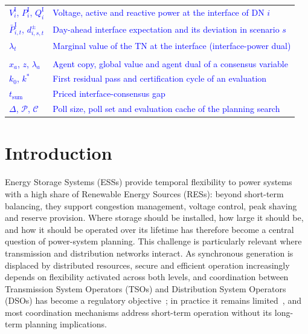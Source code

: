 \documentclass[preprint,12pt]{elsarticle}
\begin{document}
\begin{longtable}{@{}>{\raggedright\arraybackslash}p{} >{\raggedright\arraybackslash}p{}@{}}
        \textcolor{blue}{$V^{\text{I}}_{i}$, $P^{\text{I}}_{i}$, $Q^{\text{I}}_{i}$} & \textcolor{blue}{Voltage, active and reactive power at the interface of DN $i$} \\
        \textcolor{blue}{$\bar{P}^{\text{I}}_{i,t}$, $d^{\pm}_{i,s,t}$} & \textcolor{blue}{Day-ahead interface expectation and its deviation in scenario $s$} \\
        \textcolor{blue}{$\lambda_t$} & \textcolor{blue}{Marginal value of the TN at the interface (interface-power dual)} \\
        \midrule
        \multicolumn{2}{@{}l}{\textbf{Coordination and certification}}\\*
        \textcolor{blue}{$x_a$, $z$, $\lambda_a$} & \textcolor{blue}{Agent copy, global value and agent dual of a consensus variable} \\
        \textcolor{blue}{$k_0$, $k^{*}$} & \textcolor{blue}{First residual pass and certification cycle of an evaluation} \\
        \textcolor{blue}{$t_{\text{sum}}$} & \textcolor{blue}{Priced interface-consensus gap} \\
        \textcolor{blue}{$\Delta$, $\mathcal{P}$, $\mathcal{C}$} & \textcolor{blue}{Poll size, poll set and evaluation cache of the planning search} \\
    \end{longtable}
    \addtocounter{table}{-1}
\endgroup

\newpage
\section{Introduction}

Energy Storage Systems (ESSs) provide temporal flexibility to power systems with a high share of Renewable Energy Sources (RESs): beyond short-term balancing, they support congestion management, voltage control, peak shaving and reserve provision. 
Where storage should be installed, how large it should be, and how it should be operated over its lifetime has therefore become a central question of power-system planning. This challenge is particularly relevant where transmission and distribution networks interact. As synchronous generation is displaced by distributed resources, secure and efficient operation increasingly depends on flexibility activated across both levels, and coordination between Transmission System Operators (TSOs) and Distribution System Operators (DSOs) has become a regulatory objective~\cite{eu_regulation_2017,eu_regulation_2019}; in practice it remains limited~\cite{cadre_2019}, and most coordination mechanisms address short-term operation without its long-term planning implications.
\end{document}
